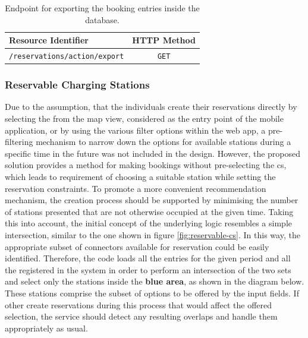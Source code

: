 \begingroup
\setlength{\tabcolsep}{10pt} %
\renewcommand{\arraystretch}{1.5} %
\begin{table}[h]
\centering
\caption{Endpoint for exporting the booking entries inside the database.}
    \begin{tabular}{l|c}
    Resource Identifier & HTTP Method \\ \hline
    \texttt{/reservations/action/export} & \texttt{GET}
    \end{tabular}
\label{tab:export-reservation-rest}
\end{table}
\endgroup

\subsubsection{Reservable Charging Stations}
\label{ch:Implementation:sec:Reservation System:ssec:Additional Capabilities:sssec:Reservable Charging Stations}

Due to the assumption, that the individuals create their reservations directly by selecting the  from the map view, considered as the entry point of the mobile application, or by using the various filter options within the web app, a pre-filtering mechanism to narrow down the options for available stations during a specific time in the future was not included in the design.
However, the proposed solution provides a method for making bookings without pre-selecting the \acrshort{cs}, which leads to requirement of choosing a suitable station while setting the reservation constraints. To promote a more convenient recommendation mechanism, the creation process should be supported by minimising the number of stations presented that are not otherwise occupied at the given time.
Taking this into account, the initial concept of the underlying logic resembles a simple intersection, similar to the one shown in figure \ref{fig:reservable-cs}. In this way, the appropriate subset of connectors available for reservation could be easily identified.
Therefore, the code loads all the entries for the given period and all the  registered in the system in order to perform an intersection of the two sets and select only the stations inside the \textbf{blue area}, as shown in the diagram below. These stations comprise the subset of options to be offered by the input fields.
If other  create reservations during this process that would affect the offered selection, the service should detect any resulting overlaps and handle them appropriately as usual.

